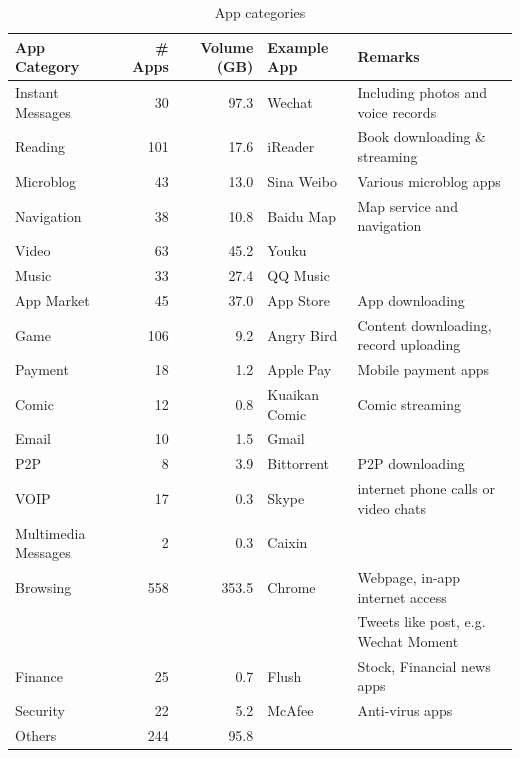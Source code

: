 \begin{table}[ht]
	\centering
	\begin{tabular}{lrrll}\hline
	App Category & \# Apps & Volume (GB) & Example App & Remarks \\
    \hline
	Instant Messages & 30 & 97.3 & Wechat & Including photos and voice records \\
	Reading & 101 & 17.6 & iReader & Book downloading \& streaming \\
	Microblog & 43 & 13.0 & Sina Weibo & Various microblog apps \\
	Navigation  & 38 & 10.8 & Baidu Map & Map service and navigation \\
	Video  & 63 & 45.2 & Youku & \\
	Music  & 33 & 27.4 & QQ Music & \\
	App Market & 45 & 37.0 & App Store & App downloading \\
	Game  & 106 & 9.2 & Angry Bird & Content downloading, record uploading \\
	Payment & 18 & 1.2 & Apple Pay & Mobile payment apps \\
	Comic & 12 & 0.8 & Kuaikan Comic & Comic streaming \\
	Email & 10 & 1.5 & Gmail & \\
	P2P & 8 & 3.9 & Bittorrent & P2P downloading \\
	VOIP  & 17 & 0.3 & Skype & internet phone calls or video chats \\
	Multimedia Messages & 2 & 0.3 & Caixin & \\
	Browsing & 558 & 353.5 & Chrome & Webpage, in-app internet access\\
     & & & & Tweets like post, e.g. Wechat Moment  \\
	Finance  & 25 & 0.7 & Flush & Stock, Financial news apps \\
	Security  & 22 & 5.2 & McAfee & Anti-virus apps\\
    Others  & 244 & 95.8 & & \\
    \hline
	\end{tabular}
	\caption{App categories}
	\label{table:appcat}
\end{table}

